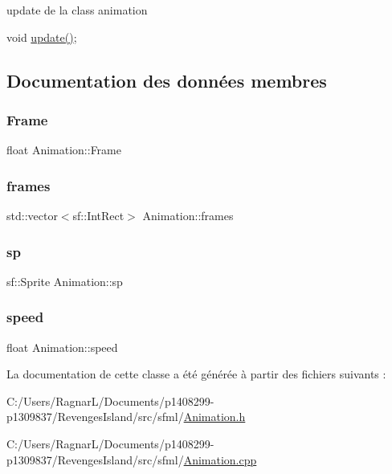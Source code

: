 update de la class animation 

void \hyperlink{class_animation_a4318baf0b0735e7da87b2c6d3d3a2705}{update()}; 

\subsection{Documentation des données membres}
\mbox{\label{class_animation_a2c7bd0213e063da804e2bec388587399}} 
\subsubsection{\texorpdfstring{Frame}{Frame}}
{\footnotesize\ttfamily float Animation\+::\+Frame}

\mbox{\label{class_animation_a25d2fc2d769f9ff7eda63bff7cd8e958}} 
\subsubsection{\texorpdfstring{frames}{frames}}
{\footnotesize\ttfamily std\+::vector$<$sf\+::\+Int\+Rect$>$ Animation\+::frames}

\mbox{\label{class_animation_a6c359fdd53ab0539caa9e073cc1b0613}} 
\subsubsection{\texorpdfstring{sp}{sp}}
{\footnotesize\ttfamily sf\+::\+Sprite Animation\+::sp}

\mbox{\label{class_animation_a68079384a94a0ebdba03241f1937608e}} 
\subsubsection{\texorpdfstring{speed}{speed}}
{\footnotesize\ttfamily float Animation\+::speed}



La documentation de cette classe a été générée à partir des fichiers suivants \+:\begin{DoxyCompactItemize}
\item 
C\+:/\+Users/\+Ragnar\+L/\+Documents/p1408299-\/p1309837/\+Revenges\+Island/src/sfml/\hyperlink{_animation_8h}{Animation.\+h}\item 
C\+:/\+Users/\+Ragnar\+L/\+Documents/p1408299-\/p1309837/\+Revenges\+Island/src/sfml/\hyperlink{_animation_8cpp}{Animation.\+cpp}\end{DoxyCompactItemize}
